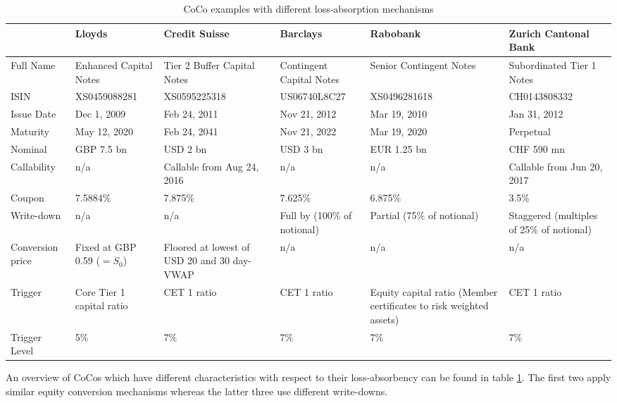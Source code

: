 \begin{table}[H]
	\tiny
	\setlength{\extrarowheight}{2.5pt}
	\centering
	\begin{tabular}{p{1.5cm}p{2cm}p{2cm}p{2cm}p{2cm}p{2cm}}
		\toprule
			& Lloyds & Credit Suisse & Barclays & Rabobank & Zurich Cantonal Bank \\ 
		\midrule
			Full Name & Enhanced Capital Notes & Tier 2 Buffer Capital Notes & Contingent Capital Notes & Senior Contingent Notes & Subordinated Tier 1 Notes \\
			ISIN & XS0459088281 & XS0595225318 & US06740L8C27 & XS0496281618 & CH0143808332 \\
			Issue Date & Dec 1, 2009 & Feb 24, 2011 & Nov 21, 2012 & Mar 19, 2010 & Jan 31, 2012 \\ 
			Maturity & May 12, 2020 & Feb 24, 2041 & Nov 21, 2022 & Mar 19, 2020 & Perpetual \\ 
		\midrule
			Nominal & GBP 7.5 bn  & USD 2 bn & USD 3 bn & EUR 1.25 bn & CHF 590 mn\\
			Callability & n/a & Callable from Aug 24, 2016 & n/a & n/a & Callable from Jun 20, 2017 \\	
			Coupon & 7.5884\% & 7.875\% & 7.625\% & 6.875\% & 3.5\% \\
		\midrule
			Write-down & n/a & n/a & Full by (100\% of notional) & Partial (75\% of notional) & Staggered (multiples of 25\% of notional) \\
			Conversion price & Fixed at GBP 0.59 ($=S_0$) & Floored at lowest of USD 20 and 30 day-VWAP & n/a & n/a & n/a \\
			Trigger & Core Tier 1 capital ratio & CET 1 ratio & CET 1 ratio & Equity capital ratio (Member certificates to risk weighted assets)& CET 1 ratio \\
			Trigger Level & 5\% & 7\% & 7\% & 7\% & 7\% \\
		\bottomrule
	\end{tabular}
	\caption[CoCo examples with different loss-absorption mechanisms]{CoCo examples with different loss-absorption mechanisms \citep{lloyds2009, creditsuisse2011, barclays2010, rabobank2010, zkv2013}}
	\label{tbl:examples}
\end{table}

An overview of CoCos which have different characteristics with respect to their loss-absorbency can be found in table \ref{tbl:examples}. The first two apply similar equity conversion mechanisms whereas the latter three use different write-downs.

